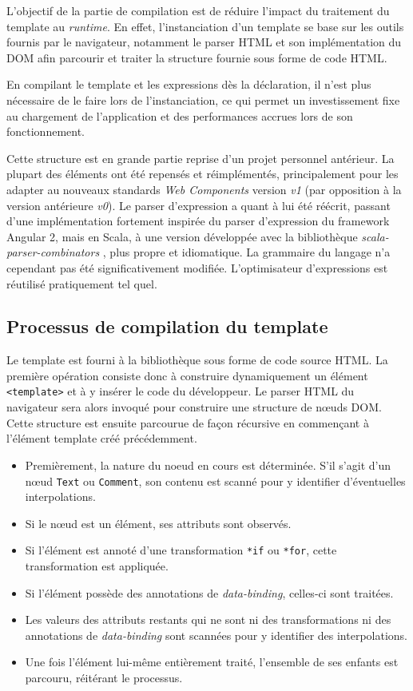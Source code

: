 L'objectif de la partie de compilation est de réduire l'impact du traitement du template au \emph{runtime}. En effet, l'instanciation d'un template se base sur les outils fournis par le navigateur, notamment le parser HTML et son implémentation du DOM afin parcourir et traiter la structure fournie sous forme de code HTML.

En compilant le template et les expressions dès la déclaration, il n'est plus nécessaire de le faire lors de l'instanciation, ce qui permet un investissement fixe au chargement de l'application et des performances accrues lors de son fonctionnement.

Cette structure est en grande partie reprise d'un projet personnel antérieur. La plupart des éléments ont été repensés et réimplémentés, principalement pour les adapter au nouveaux standards \emph{Web Components} version \emph{v1} (par opposition à la version antérieure \emph{v0}). Le parser d'expression a quant à lui été réécrit, passant d'une implémentation fortement inspirée du parser d'expression du framework Angular 2, mais en Scala, à une version développée avec la bibliothèque \emph{scala-parser-combinators} \cite{scala-parser-combinators}, plus propre et idiomatique. La grammaire du langage n'a cependant pas été significativement modifiée. L'optimisateur d'expressions est réutilisé pratiquement tel quel.

\subsection{Processus de compilation du template}

Le template est fourni à la bibliothèque sous forme de code source HTML. La première opération consiste donc à construire dynamiquement un élément \texttt{<template>} et à y insérer le code du développeur. Le parser HTML du navigateur sera alors invoqué pour construire une structure de nœuds DOM. Cette structure est ensuite parcourue de façon récursive en commençant à l'élément template créé précédemment.

\begin{itemize}
	\item Premièrement, la nature du noeud en cours est déterminée. S'il s'agit d'un nœud \texttt{Text} ou \texttt{Comment}, son contenu est scanné pour y identifier d'éventuelles interpolations.
	\item Si le nœud est un élément, ses attributs sont observés.
	\item Si l'élément est annoté d'une transformation \texttt{*if} ou \texttt{*for}, cette transformation est appliquée.
	\item Si l'élément possède des annotations de \emph{data-binding}, celles-ci sont traitées.
	\item Les valeurs des attributs restants qui ne sont ni des transformations ni des annotations de \emph{data-binding} sont scannées pour y identifier des interpolations.
	\item Une fois l'élément lui-même entièrement traité, l'ensemble de ses enfants est parcouru, réitérant le processus.
\end{itemize}


